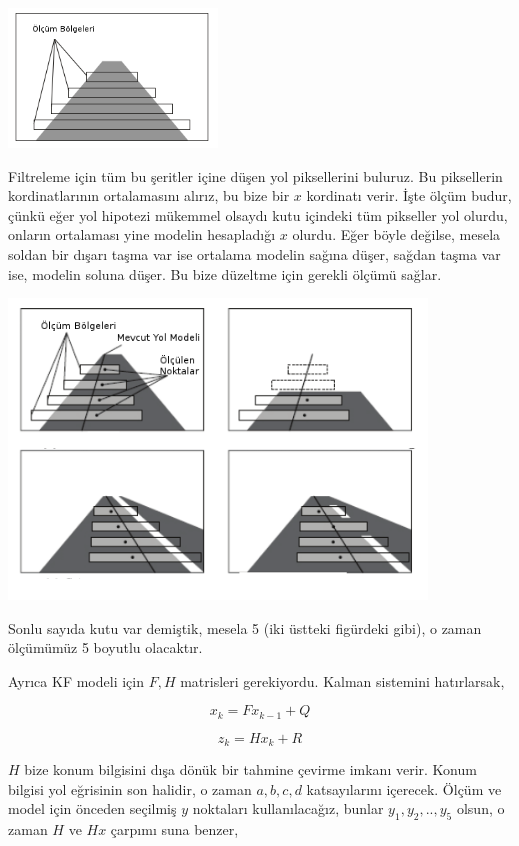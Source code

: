 \documentclass[12pt,fleqn]{article}\usepackage{../../common}
\begin{document}
\includegraphics[width=15em]{vision_70road_01.png}

Filtreleme için tüm bu şeritler içine düşen yol piksellerini buluruz. Bu
piksellerin kordinatlarının ortalamasını alırız, bu bize bir $x$ kordinatı
verir. İşte ölçüm budur, çünkü eğer yol hipotezi mükemmel olsaydı kutu
içindeki tüm pikseller yol olurdu, onların ortalaması yine modelin
hesapladığı $x$ olurdu. Eğer böyle değilse, mesela soldan bir dışarı taşma
var ise ortalama modelin sağına düşer, sağdan taşma var ise, modelin soluna
düşer. Bu bize düzeltme için gerekli ölçümü sağlar. 

\includegraphics[width=30em]{vision_70road_02.png}

Sonlu sayıda kutu var demiştik, mesela 5 (iki üstteki figürdeki gibi), o
zaman ölçümümüz 5 boyutlu olacaktır. 

Ayrıca KF modeli için $F,H$ matrisleri gerekiyordu. Kalman sistemini
hatırlarsak,

$$ x_k = Fx_{k-1} + Q $$

$$ z_k = Hx_k + R $$

$H$ bize konum bilgisini dışa dönük bir tahmine çevirme imkanı verir. Konum
bilgisi yol eğrisinin son halidir, o zaman $a,b,c,d$ katsayılarını
içerecek.  Ölçüm ve model için önceden seçilmiş $y$ noktaları
kullanılacağız, bunlar $y_1,y_2,..,y_5$ olsun, o zaman $H$ ve $H x$ çarpımı
suna benzer,
\end{document}
